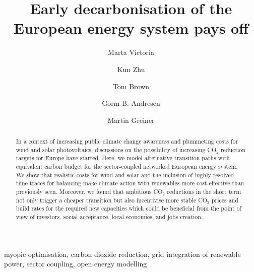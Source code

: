 \documentclass[5p]{elsarticle} %
\begin{document}
\begin{frontmatter}

\title{Early decarbonisation of the European energy system pays off}

\author[mymainaddress,iClimate]{Marta Victoria}
\author[mymainaddress]{Kun Zhu}
\author[kitaddress]{Tom Brown}
\author[mymainaddress,iClimate]{Gorm B. Andresen}
\author[mymainaddress,iClimate]{Martin Greiner}
\address[mymainaddress]{Department of Engineering, Aarhus University, Inge Lehmanns Gade 10, 8000 Aarhus, Denmark}
\address[iClimate]{iCLIMATE Interdisciplinary Centre for Climate Change, Aarhus University}
\address[kitaddress]{Institute for Automation and Applied Informatics (IAI), Karlsruhe Institute of Technology (KIT), Forschungszentrum 449, 76344, Eggenstein-Leopoldshafen, Germany}


\begin{abstract}

In a context of increasing public climate change awareness and plummeting costs for wind and solar photovoltaics, discussions on the possibility of increasing CO$_2$ reduction targets for Europe have started. Here, we model alternative transition paths with equivalent carbon budget for the sector-coupled networked European energy system. We show that realistic costs for wind and solar and the inclusion of highly resolved time traces for balancing make climate action with renewables more cost-effective than previously seen. Moreover, we found that ambitious CO$_2$ reductions in the short term not only trigger a cheaper transition but also incentivise more stable CO$_2$ prices and build rates for the required new capacities which could be beneficial from the point of view of investors, social acceptance, local economies, and jobs creation.

\end{abstract}

\begin{keyword}
myopic optimisation, carbon dioxide reduction, grid integration of renewable power, sector coupling, open energy modelling
\end{keyword}

\end{frontmatter}
\end{document}

